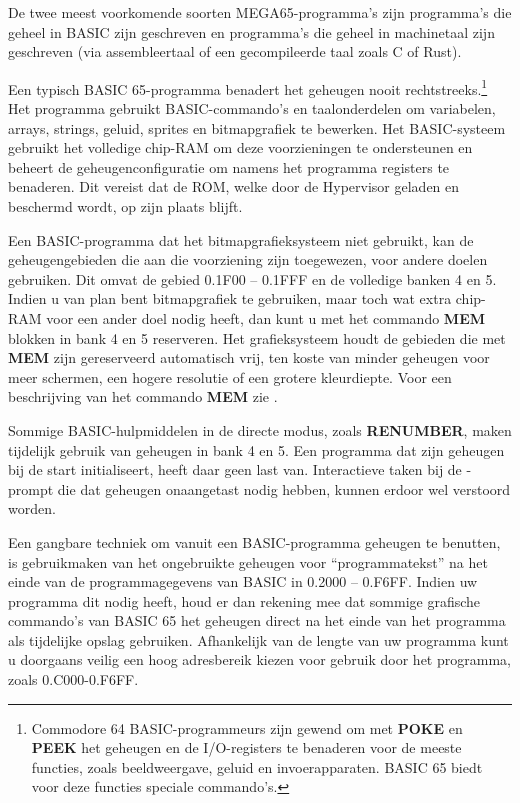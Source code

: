 De twee meest voorkomende soorten MEGA65-programma's zijn programma's die geheel in BASIC zijn geschreven en programma's die geheel in machinetaal zijn geschreven (via assembleertaal of een gecompileerde taal zoals C of Rust).

Een typisch BASIC 65-programma benadert het geheugen nooit rechtstreeks.\footnote{Commodore 64 BASIC-programmeurs zijn gewend om met {\bf POKE} en {\bf PEEK} het geheugen en de I/O-registers te benaderen voor de meeste functies, zoals beeldweergave, geluid en invoerapparaten. BASIC 65 biedt voor deze functies speciale commando's.} Het programma gebruikt BASIC-commando's en taalonderdelen om variabelen, arrays, strings, geluid, sprites en bitmapgrafiek te bewerken. Het BASIC-systeem gebruikt het volledige chip-RAM om deze voorzieningen te ondersteunen en beheert de geheugenconfiguratie om namens het programma registers te benaderen. Dit vereist dat de ROM, welke door de Hypervisor geladen en beschermd wordt, op zijn plaats blijft.

Een BASIC-programma dat het bitmapgrafieksysteem niet gebruikt, kan de geheugengebieden die aan die voorziening zijn toegewezen, voor andere doelen gebruiken. Dit omvat de gebied 0.1F00 -- 0.1FFF en de volledige banken 4 en 5. Indien u van plan bent bitmapgrafiek te gebruiken, maar toch wat extra chip-RAM voor een ander doel nodig heeft, dan kunt u met het commando {\bf MEM} blokken in bank 4 en 5 reserveren. Het grafieksysteem houdt de gebieden die met {\bf MEM} zijn gereserveerd automatisch vrij, ten koste van minder geheugen voor meer schermen, een hogere resolutie of een grotere kleurdiepte. Voor een beschrijving van het commando {\bf MEM} zie .

Sommige BASIC-hulpmiddelen in de directe modus, zoals {\bf RENUMBER}, maken tijdelijk gebruik van geheugen in bank 4 en 5. Een programma dat zijn geheugen bij de start initialiseert, heeft daar geen last van. Interactieve taken bij de -prompt die dat geheugen onaangetast nodig hebben, kunnen erdoor wel verstoord worden.

Een gangbare techniek om vanuit een BASIC-programma geheugen te benutten, is gebruikmaken van het ongebruikte geheugen voor ``programmatekst'' na het einde van de programmagegevens van BASIC in 0.2000 -- 0.F6FF. Indien uw programma dit nodig heeft, houd er dan rekening mee dat sommige grafische commando's van BASIC 65 het geheugen direct na het einde van het programma als tijdelijke opslag gebruiken. Afhankelijk van de lengte van uw programma kunt u doorgaans veilig een hoog adresbereik kiezen voor gebruik door het programma, zoals 0.C000-0.F6FF.

